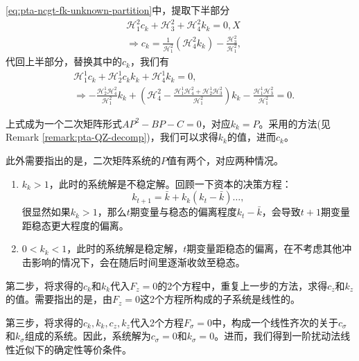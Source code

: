 \eqref{eq:pta-ncgt-fk-unknown-partition}中，提取下半部分
\begin{equation*}
  \begin{split}
    &\mathcal{H}_1^2 c_k + \mathcal{H}_3^2 + \mathcal{H}_4^2 k_k =0,X\\
    & \Rightarrow c_k = \frac{1}{\mathcal{H}_{1}^2} \left( \mathcal{H}_{4}^2 k_k \right) - \frac{\mathcal{H}_3^2}{\mathcal{H}_1^2},
  \end{split}
\end{equation*}
代回上半部分，替换其中的$c_k$，我们有
\begin{equation*}
  \begin{split}
    &\mathcal{H}_{1}^1 c_k + \mathcal{H}_2^1 c_k k_k + \mathcal{H}_4^1 k_k = 0, \\
    &\Rightarrow -\frac{\mathcal{H}_2^1 \mathcal{H}_4^2}{\mathcal{H}_1^2} k_k + \left(
    \mathcal{H}_4^2 - \frac{\mathcal{H}_1^1 \mathcal{H}_4^2 + \mathcal{H}_2^1 \mathcal{H}_3^2}{\mathcal{H}_1^2}
    \right) k_k -
    \frac{\mathcal{H}_1^1 \mathcal{H}_3^2}{\mathcal{H}_{1}^2}=0.
  \end{split}
\end{equation*}

上式成为一个二次矩阵形式$A P^2 - B P - C = 0$，对应$k_k = P$。采用\cite{Uhlig:1999vx}的方法(见Remark \ref{remark:pta-QZ-decomp})，我们可以求得$k_k$的值，进而$c_k$。

此外需要指出的是，二次矩阵系统的$P$值有两个，对应两种情况。
\begin{enumerate}
  \item $k_k >1$，此时的系统解是不稳定解。回顾一下资本的决策方程：
  \begin{equation*}
    k_{t+1} = \bar{k} + k_k \left(k_t - \bar{k} \right) \ldots,
  \end{equation*}
  很显然如果$k_k >1$，那么$t$期变量与稳态的偏离程度$k_t-\bar{k}$，会导致$t+1$期变量距稳态更大程度的偏离。
  \item $0<k_k<1$，此时的系统解是稳定解，$t$期变量距稳态的偏离，在不考虑其他冲击影响的情况下，会在随后时间里逐渐收敛至稳态。
\end{enumerate}

第二步，将求得的$c_k$和$k_k$代入$F_z=0$的2个方程中，重复上一步的方法，求得$c_z$和$k_z$的值。需要指出的是，由$F_z=0$这2个方程所构成的子系统是线性的。

第三步，将求得的$c_k,k_k,c_z,k_z$代入2个方程$F_\sigma = 0$中，构成一个线性齐次的关于$c_\sigma$和$k_{\sigma}$组成的系统。因此，系统解为$c_{\sigma}=0$和$k_{\sigma} = 0$。进而，我们得到一阶扰动法线性近似下的确定性等价条件。

